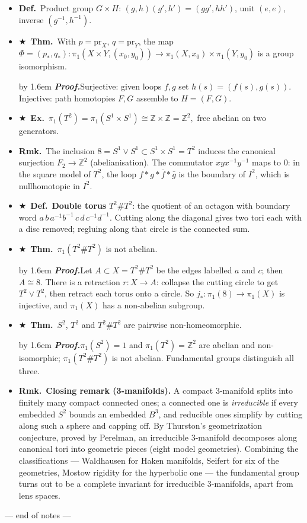 \documentclass[12pt,a4paper]{article}
\newcommand{\Dfn}{\textbf{Def.}~}
\newcommand{\Thm}{\textbf{Thm.}~}
\newcommand{\Exa}{\textbf{Ex.}~}
\newcommand{\Rmk}{\textbf{Rmk.}~}
\newcommand{\Key}{$\bigstar$~}                  %
\newcommand{\Pf}[1]{%
  \par\addvspace{7pt}\nopagebreak
  \begingroup
    \advance\leftskip by 1.6em
    \parindent=0pt \small\color{prf}%
    \textbf{\textit{Proof.}}\enspace #1\par
  \endgroup
  \addvspace{9pt}}
\newenvironment{BL}%
  {\begin{itemize}[leftmargin=1.4em,labelsep=0.55em,itemsep=11pt,topsep=11pt,parsep=0pt]}%
  {\end{itemize}}
\newcommand{\ZZ}{\mathbb{Z}}
\newcommand{\To}{\longrightarrow}
\begin{document}
\begin{BL}
\item \Dfn Product group $G\times H$: $(g,h)(g',h')=(gg',hh')$, unit $(e,e)$,
      inverse $(g^{-1},h^{-1})$.
\item \Key\Thm With $p=\mathrm{pr}_X$, $q=\mathrm{pr}_Y$, the map
      \(\Phi=(p_*,q_*)\colon\pi_1(X\times Y,(x_0,y_0))\To\pi_1(X,x_0)\times\pi_1(Y,y_0)\)
      is a group isomorphism.
\Pf{Surjective: given loops $f,g$ set $h(s)=(f(s),g(s))$.
Injective: path homotopies $F,G$ assemble to $H=(F,G)$.}
\item \Key\Exa \(\pi_1(T^2)=\pi_1(S^1\times S^1)\cong\ZZ\times\ZZ=\ZZ^2,\)
      free abelian on two generators.
\item \Rmk The inclusion $8=S^1\vee S^1\subset S^1\times S^1=T^2$ induces the canonical
      surjection $F_2\to\ZZ^2$ (abelianisation).
      The commutator $xyx^{-1}y^{-1}$ maps to $0$: in the square model of $T^2$, the loop
      $f*g*\bar f*\bar g$ is the boundary of $I^2$, which is nullhomotopic in $I^2$.
\item \Key\Dfn \textbf{Double torus} $T^2\# T^2$: the quotient of an octagon with boundary word
      \(a\,b\,a^{-1}b^{-1}\,c\,d\,c^{-1}d^{-1}.\)
      Cutting along the diagonal gives two tori each with a disc removed; regluing along that
      circle is the connected sum.
\item \Key\Thm $\pi_1(T^2\# T^2)$ is not abelian.
\Pf{Let $A\subset X=T^2\#T^2$ be the edges labelled $a$ and $c$; then $A\cong8$.
There is a retraction $r\colon X\to A$: collapse the cutting circle to get $T^2\vee T^2$,
then retract each torus onto a circle. So $j_*\colon\pi_1(8)\to\pi_1(X)$ is injective,
and $\pi_1(X)$ has a non-abelian subgroup.}
\item \Key\Thm $S^2$, $T^2$ and $T^2\#T^2$ are pairwise non-homeomorphic.
\Pf{$\pi_1(S^2)=1$ and $\pi_1(T^2)=\ZZ^2$ are abelian and non-isomorphic;
$\pi_1(T^2\#T^2)$ is not abelian. Fundamental groups distinguish all three.}
\item \Rmk \textbf{Closing remark (3-manifolds).} A compact 3-manifold splits into finitely many
      compact connected ones; a connected one is \emph{irreducible} if every embedded $S^2$
      bounds an embedded $B^3$, and reducible ones simplify by cutting along such a sphere and
      capping off. By Thurston's geometrization conjecture, proved by Perelman, an irreducible
      3-manifold decomposes along canonical tori into geometric pieces (eight model geometries).
      Combining the classifications --- Waldhausen for Haken manifolds, Seifert for six of the
      geometries, Mostow rigidity for the hyperbolic one --- the fundamental group turns out to
      be a complete invariant for irreducible 3-manifolds, apart from lens spaces.
\end{BL}

\vfill
\begin{center}\small\color{cue}
--- end of notes ---
\end{center}
\end{document}

